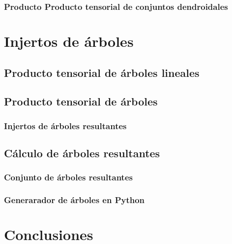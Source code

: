 \documentclass[11pt,a4paper,openright,oneside]{article}
\numberwithin{equation}{section}
\theoremstyle{definition}
\begin{document}
\subsubsection{Producto Producto tensorial de conjuntos dendroidales}
\newpage


\section{Injertos de \'arboles}
\subsection{Producto tensorial de \'arboles lineales}
\subsection{Producto tensorial de \'arboles}
\subsubsection{Injertos de \'arboles resultantes}
\subsection{C\'alculo de \'arboles resultantes}
\subsubsection{Conjunto de \'arboles resultantes}
\subsubsection{Generarador de \'arboles en Python}
\newpage


\section{Conclusiones}
\newpage

\end{document}
